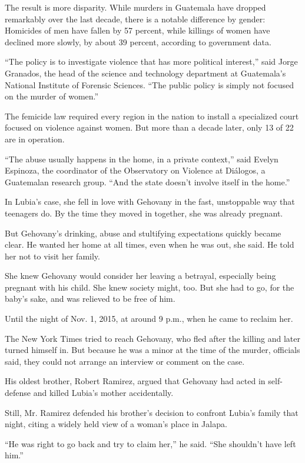 The result is more disparity. While murders in Guatemala have dropped
remarkably over the last decade, there is a notable difference by
gender: Homicides of men have fallen by 57 percent, while killings of
women have declined more slowly, by about 39 percent, according to
government data.

``The policy is to investigate violence that has more political
interest,'' said Jorge Granados, the head of the science and technology
department at Guatemala's National Institute of Forensic Sciences. ``The
public policy is simply not focused on the murder of women.''

The femicide law required every region in the nation to install a
specialized court focused on violence against women. But more than a
decade later, only 13 of 22 are in operation.

``The abuse usually happens in the home, in a private context,'' said
Evelyn Espinoza, the coordinator of the Observatory on Violence at
Diálogos, a Guatemalan research group. ``And the state doesn't involve
itself in the home.''

In Lubia's case, she fell in love with Gehovany in the fast, unstoppable
way that teenagers do. By the time they moved in together, she was
already pregnant.

But Gehovany's drinking, abuse and stultifying expectations quickly
became clear. He wanted her home at all times, even when he was out, she
said. He told her not to visit her family.

She knew Gehovany would consider her leaving a betrayal, especially
being pregnant with his child. She knew society might, too. But she had
to go, for the baby's sake, and was relieved to be free of him.

Until the night of Nov. 1, 2015, at around 9 p.m., when he came to
reclaim her.

The New York Times tried to reach Gehovany, who fled after the killing
and later turned himself in. But because he was a minor at the time of
the murder, officials said, they could not arrange an interview or
comment on the case.

His oldest brother, Robert Ramirez, argued that Gehovany had acted in
self-defense and killed Lubia's mother accidentally.

Still, Mr. Ramirez defended his brother's decision to confront Lubia's
family that night, citing a widely held view of a woman's place in
Jalapa.

``He was right to go back and try to claim her,'' he said. ``She
shouldn't have left him.''

